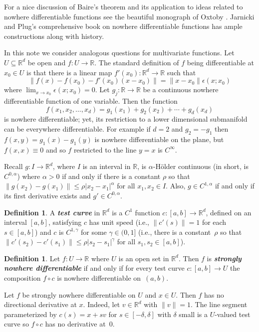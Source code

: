 \documentclass[12pt]{amsart}
\numberwithin{equation}{section}
\newcommand{\bi}[1]{{\boldmath\textbf{\itshape{#1}}}} %
\newcommand{\R}{{\mathbb R}}		%
\newcommand{\cn}{\colon}                %
\theoremstyle{definition}
\newtheorem{defn}[thm]{Definition}
\theoremstyle{remark}
\begin{document}
For a nice discussion of Baire's theorem and
its application to ideas related to nowhere
differentiable functions see the beautiful
monograph of Oxtoby \cite{Oxtoby:book}.
Jarnicki and Plug's  comprehensive book
\cite{Jarnicki_Pflug} on nowhere differentiable functions
has ample constructions along with  history.


In this note we consider analogous questions for multivariate functions.
Let $U \subseteq \R^d $ be open and $f\cn U \to \R$.  The standard
definition of $f$ being differentiable at $x_0\in U$ is that there is
a linear map $f'(x_0)\cn \R^d \to \R$ such that 
$$
\| f(x) - f(x_0)- f'(x_0)(x-x_0)\| = \|x-x_0\|\epsilon(x;x_0)
$$
where $\lim_{x\to x_0}\epsilon(x;x_0)=0$.
Let
$g_j\cn \R \to \R$ be a continuous
nowhere differentiable function of one variable.
Then the function
$$
f(x_1,x_2 ,\ldots, x_d) = g_1(x_1) + g_2(x_2) + \cdots + g_d(x_d)
$$
is nowhere differentiable; yet, 
its restriction to a lower dimensional submanifold can be everywhere  differentiable.
%
For example if  $d=2$ and  $g_2=-g_1$  then  $f(x,y) = g_1(x)-g_1(y)$
is nowhere differentiable on the plane,
but $f(x,x)\equiv 0$ and so $f$ restricted to
the line $y=x$ is $C^\infty$.

Recall $g:I\to\R^d$,
where $I$ is an interval in $\R$,
is $\alpha$-H\"older continuous (in short, is $C^{0,\alpha}$)
where $\alpha>0$
if and only if
there is a constant $\rho$ so that
$\| g(x_2) - g(x_1)\| \leq \rho |x_2 -x_1|^\alpha$ for all $x_1, x_2 \in I$.
Also, $g\in C^{1,\alpha}$
if and only if
its first derivative exists and 
$g'\in C^{0,\alpha}$.

\begin{defn}\label{def:test_curve}
A \bi{test curve} in $\R^d$ is a $C^1$ function $c\cn [a,b] \to \R^d$,
defined on an  interval $[a,b]$,
satisfying
$c$ has unit speed 
(i.e.,  $\|c'(s)\| = 1$ for each $s\in[a,b]$)
and $c$  is $C^{1,\gamma}$ for some $\gamma\in(0,1]$
(i.e., there is a constant~$\rho$ so that 
  $\|c'(s_2) - c'(s_1)\|\le \rho |s_2-s_1|^\gamma$
  for all $s_1, s_2\in[a,b]$).
\end{defn}


\begin{defn}
Let $f\cn U \to \R$ where $U$ is an open set in $\R^d$.  Then
$f$ is \bi{strongly nowhere differentiable} if and only if
for every test curve $c\cn [a,b] \to U$ the composition
$f\circ c$ %
is nowhere differentiable on~$(a,b)$.
\end{defn}


Let $f$ be strongly nowhere differentiable on $U$ and $x\in U$.
Then $f$ has no directional derivative at $x$.
Indeed,  let   $v\in  \R^d$ with $\| v\| = 1$.
The line segment parameterized by
$c(s)= x+sv$ for $s\in  [-\delta, \delta]$ with $\delta$
small is  a $U$-valued test curve 
so $f\circ c$ has no derivative at~$0$.
\end{document}
